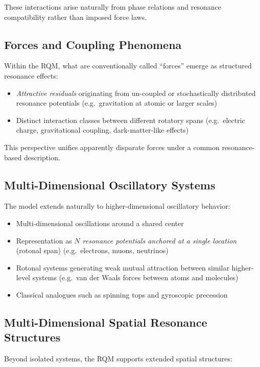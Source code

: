 \documentclass[11pt,a4paper]{article}
\begin{document}
These interactions arise naturally from phase relations and resonance compatibility rather than imposed force laws.

\subsection{Forces and Coupling Phenomena}

Within the RQM, what are conventionally called ``forces'' emerge as structured resonance effects:

\begin{itemize}
  \item \emph{Attractive residuals} originating from un-coupled or stochastically distributed resonance potentials (e.g.\ gravitation at atomic or larger scales)
  \item Distinct interaction classes between different rotatory spans (e.g.\ electric charge, gravitational coupling, dark-matter-like effects)
\end{itemize}

This perspective unifies apparently disparate forces under a common resonance-based description.

\subsection{Multi-Dimensional Oscillatory Systems}

The model extends naturally to higher-dimensional oscillatory behavior:

\begin{itemize}
  \item Multi-dimensional oscillations around a shared center
  \item Representation as \emph{$N$ resonance potentials anchored at a single location} (rotonal span) (e.g.\ electrons, muons, neutrinos)
  \item Rotonal systems generating weak mutual attraction between similar higher-level systems (e.g.\ van der Waals forces between atoms and molecules)
  \item Classical analogues such as spinning tops and gyroscopic precession
\end{itemize}

\subsection{Multi-Dimensional Spatial Resonance Structures}

Beyond isolated systems, the RQM supports extended spatial structures:
\end{document}
